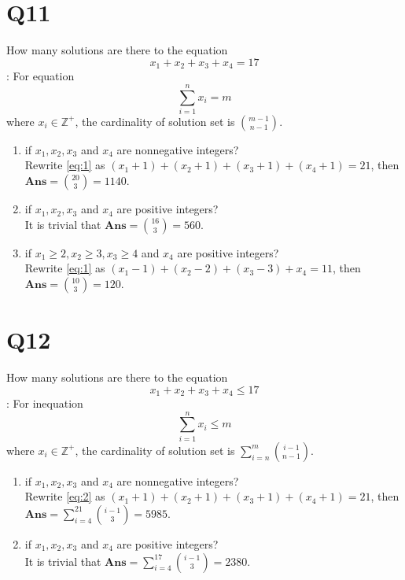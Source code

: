 \documentclass[a4paper,11pt]{article}
\newenvironment{qparts}{\begin{enumerate}[{(}a{)}]}{\end{enumerate}}
\newenvironment{solution}{{\\\bf Solution}:}{\smallskip}
\begin{document}
\section*{Q11}
How many solutions are there to the equation
\begin{equation}
  x_1+x_2+x_3+x_4=17\label{eq:1}
\end{equation}
\begin{solution}
    For equation 
    $$
    \sum_{i=1}^{n}x_{i }=m
    $$ where $x_{i }\in \mathbb{Z}^{+}$, the cardinality of solution set 
    is $\binom{m-1}{n-1}$.
    \begin{qparts}
    
        \item  if $x_1,x_2,x_3$ and $x_4$ are nonnegative integers?\\
        Rewrite \eqref{eq:1} as $(x_1+1)+ (x_2+1)+ (x_3+1)+ (x_4+1)=21$, then 
        $\textbf{Ans}=\binom{20}{3}=1140$.
    
        \item  if $x_1,x_2,x_3$ and $x_4$ are positive integers?\\
        It is trivial that $\textbf{Ans}=\binom{16}{3}=560$.
    
        \item  if $x_1\ge 2,x_2\ge 3,x_3\ge 4$ and $x_4$ are positive integers?\\
        Rewrite \eqref{eq:1} as $(x_1-1)+ (x_2-2)+ (x_3-3)+ x_4=11$, then
        $\textbf{Ans}=\binom{10}{3}=120$.
    \end{qparts}
\end{solution}


\section*{Q12}
How many solutions are there to the equation 
\begin{equation}
  x_1+x_2+x_3+x_4\le 17 \label{eq:2}
\end{equation}
\begin{solution}
    For inequation 
    $$
    \sum_{i=1}^{n}x_{i }\le m
    $$ where $x_{i }\in \mathbb{Z}^{+}$, the cardinality of solution set 
    is $\sum_{i= n}^{m}\binom{i-1}{n-1}$.

    \begin{qparts}
        \item  if $x_1,x_2,x_3$ and $x_4$ are nonnegative integers?\\
        Rewrite \eqref{eq:2} as $(x_1+1)+ (x_2+1)+ (x_3+1)+ (x_4+1)=21$, then 
        $\textbf{Ans}=\sum_{i=4}^{21}\binom{i-1}{3}=5985$.
        
        \item  if $x_1,x_2,x_3$ and $x_4$ are positive integers?\\
        It is trivial that $\textbf{Ans}=\sum_{i=4}^{17}\binom{i-1}{3}=2380$.

    \end{qparts}
\end{solution}
\end{document}
